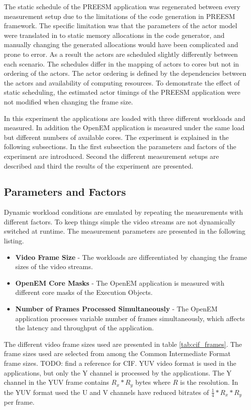 The static schedule of the PREESM application was regenerated between every
measurement setup due to the limitations of the code generation in PREESM
framework. The specific limitation was that the parameters of the actor model
were translated in to static memory allocations in the code generator, and
manually changing the generated allocations would have been complicated and
prone to error. As a result the actors are scheduled slightly differently
between each scenario. The schedules differ in the mapping of actors to cores
but not in ordering of the actors. The actor ordering is defined by the
dependencies between the actors and availability of computing resources. To
demonstrate the effect of static scheduling, the estimated actor timings of the
PREESM application were not modified when changing the frame size.

In this experiment the applications are loaded with three different workloads
and measured. In addition the OpenEM application is measured under the same load
but different numbers of available cores. The experiment is explained in the
following subsections. In the first subsection the parameters and factors of the
experiment are introduced. Second the different measurement setups are described
and third the results of the experiment are presented.

\subsection{Parameters and Factors}
Dynamic workload conditions are emulated by repeating the measurements with
different factors. To keep things simple the video streams are not dynamically
switched at runtime. The measurement parameters are presented in the following
listing.

\begin{itemize}
    \item \textbf{Video Frame Size} - The workloads are differentiated by
        changing the frame sizes of the video streams.
    \item \textbf{OpenEM Core Masks} - The OpenEM application is measured
        with different core masks of the Execution Objects.
    \item \textbf{Number of Frames Processed Simultaneously} - The OpenEM
        application processes variable number of frames simultaneously, which
        affects the latency and throughput of the application.
\end{itemize}

The different video frame sizes used are presented in table
\ref{tab:cif_frames}. The frame sizes used are selected from among the Common
Intermediate Format frame sizes. TODO: find a reference for CIF. YUV video
format is used in the applications, but only the Y channel is processed by the
applications. The Y channel in the YUV frame contains $R_{x} * R_{y}$ bytes
where $R$ is the resolution. In the YUV format used the U and V channels have
reduced bitrates of $\frac{1}{4} * R_{x} * R_{y}$ per frame.

